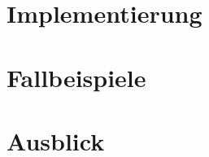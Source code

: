 \documentclass[masterarbeit]{thesis}
\begin{document}
\chapter{Implementierung}
\label{sec:implementation}

\chapter{Fallbeispiele}
\label{sec:case_studies}

\chapter{Ausblick}
\label{sec:conclusion}


\begin{appendix}
  
  
\end{appendix}
\end{document}
